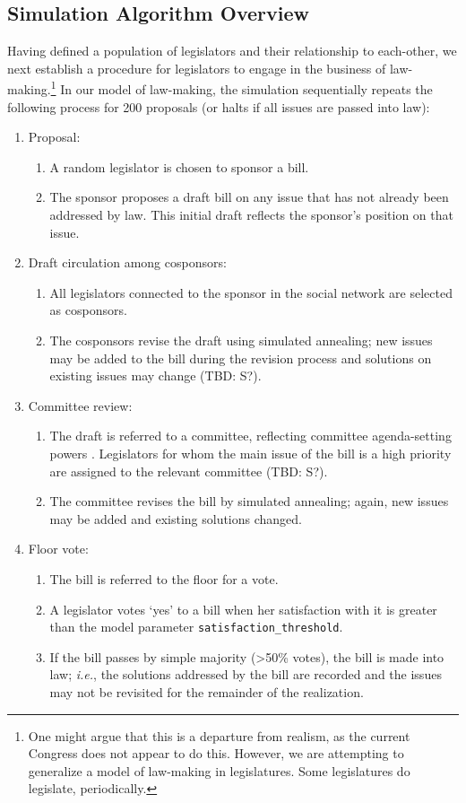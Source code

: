 \documentclass[pdftex,12pt]{llncs}
\begin{document}
\subsection{Simulation Algorithm Overview}
Having defined a population of legislators and their relationship to each-other, we next establish a procedure for legislators to engage in the business of law-making.\footnote{One might argue that this is a departure from realism, as the current Congress does not appear to do this.
However, we are attempting to generalize a model of law-making in legislatures.
Some legislatures do legislate, periodically.}
In our model of law-making, the simulation sequentially repeats the following process for 200 proposals (or halts if all issues are passed into law):
\begin{enumerate}
\item Proposal:
\begin{enumerate}
\item A random legislator is chosen to sponsor a bill.
\item The sponsor proposes a draft bill on any issue that has not already been addressed by law. This initial draft reflects the sponsor's position on that issue.
\end{enumerate}
\item Draft circulation among cosponsors:
\begin{enumerate}
\item All legislators connected to the sponsor in the social network are selected as cosponsors.
\item The cosponsors revise the draft using simulated annealing; new issues may be added to the bill during the revision process and solutions on existing issues may change (TBD: S?).
\end{enumerate}
\item Committee review:
\begin{enumerate}
\item The draft is referred to a committee, reflecting committee agenda-setting powers \parencite{cm93, cm05}.
Legislators for whom the main issue of the bill is a high priority are assigned to the relevant committee (TBD: S?).
\item The committee revises the bill by simulated annealing; again, new issues may be added and existing solutions changed.
\end{enumerate}
\item Floor vote:
\begin{enumerate}
\item The bill is referred to the floor for a vote.
\item A legislator votes `yes' to a bill when her satisfaction with it is greater than the model parameter \texttt{satisfaction\_threshold}.
\item If the bill passes by simple majority (\textgreater 50\% votes), the bill is made into law; \textit{i.e.}, the solutions addressed by the bill are recorded and the issues may not be revisited for the remainder of the realization.
\end{enumerate}
\end{enumerate}
\end{document}
